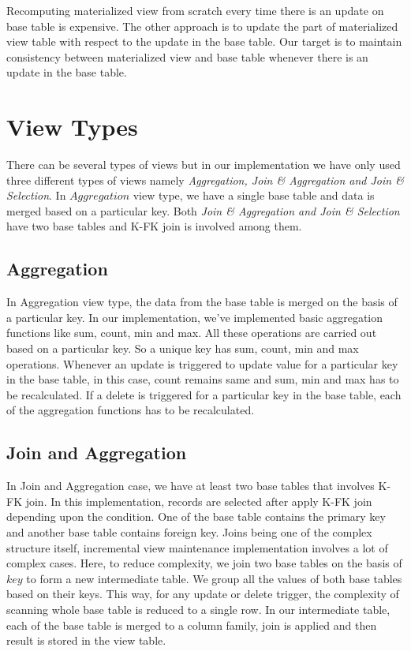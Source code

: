 \documentclass[11pt,a4paper,bibtotoc,idxtotoc,headsepline,footsepline,footexclude,BCOR12mm,DIV13]{scrbook}
\begin{document}
Recomputing materialized view from scratch every time there is an update on base table is expensive. The other approach is to update the part of materialized view table with respect to the update in the base table. Our target is to maintain consistency between materialized view and base table whenever there is an update in the base table.

\section{View Types}
\label{View Types}
There can be several types of views but in our implementation we have only used three different types of views namely \emph{Aggregation, Join \& Aggregation and Join \& Selection}. In $Aggregation$ view type, we have a single base table and data is merged based on a particular key. Both  \emph{Join \& Aggregation and Join \& Selection} have two base tables and K-FK join is involved among them. 

\subsection{Aggregation}
In Aggregation view type, the data from the base table is merged on the basis of a particular key. In our implementation, we've implemented basic aggregation functions like sum, count, min and max. All these operations are carried out based on a particular key. So a unique key has sum, count, min and max operations. Whenever an update is triggered to update value for a particular key in the base table, in this case, count remains same and sum, min and max has to be recalculated. If a delete is triggered for a particular key in the base table, each of the aggregation functions has to be recalculated. 


\subsection{Join and Aggregation}
In Join and Aggregation case, we have at least two base tables that involves K-FK join. In this implementation, records are selected after apply K-FK join depending upon the condition. One of the base table contains the primary key and another base table contains foreign key. Joins being one of the complex structure itself, incremental view maintenance implementation involves a lot of complex cases. Here, to reduce complexity, we join two base tables on the basis of $key$ to form a new intermediate table. We group all the values of both base tables based on their keys. This way, for any update or delete trigger, the complexity of scanning whole base table is reduced to a single row. In our intermediate table, each of the base table is merged to a column family, join is applied and then result is stored in the view table. 
\end{document}
